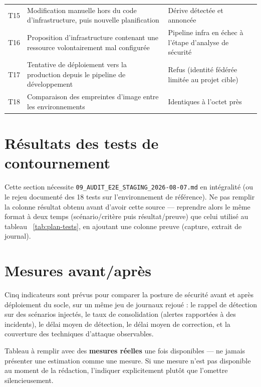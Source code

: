 \begin{longtable}{@{}P{1cm}P{6.2cm}P{6.8cm}@{}}
T15 & Modification manuelle hors du code d'infrastructure, puis nouvelle planification &
Dérive détectée et annoncée \\
T16 & Proposition d'infrastructure contenant une ressource volontairement mal configurée &
Pipeline infra en échec à l'étape d'analyse de sécurité \\
T17 & Tentative de déploiement vers la production depuis le pipeline de développement &
Refus (identité fédérée limitée au projet cible) \\
T18 & Comparaison des empreintes d'image entre les environnements & Identiques à l'octet
près \\
\bottomrule
\end{longtable}

\section{Résultats des tests de contournement}

\begin{attentedoc}
Cette section nécessite \texttt{09\_AUDIT\_E2E\_STAGING\_2026-08-07.md} en intégralité (ou
le rejeu documenté des 18 tests sur l'environnement de référence). Ne pas remplir la colonne
\og résultat obtenu \fg{} avant d'avoir cette source --- reprendre alors le même format à
deux temps (scénario/critère puis résultat/preuve) que celui utilisé au tableau~
\ref{tab:plan-tests}, en ajoutant une colonne \og preuve \fg{} (capture, extrait de
journal).
\end{attentedoc}

\section{Mesures avant/après}

Cinq indicateurs sont prévus pour comparer la posture de sécurité avant et après déploiement
du socle, sur un même jeu de journaux rejoué : le rappel de détection sur des scénarios
injectés, le taux de consolidation (alertes rapportées à des incidents), le délai moyen de
détection, le délai moyen de correction, et la couverture des techniques d'attaque
observables.

\begin{attentedoc}
Tableau à remplir avec des \textbf{mesures réelles} une fois disponibles --- ne jamais
présenter une estimation comme une mesure. Si une mesure n'est pas disponible au moment de
la rédaction, l'indiquer explicitement plutôt que l'omettre silencieusement.
\end{attentedoc}

